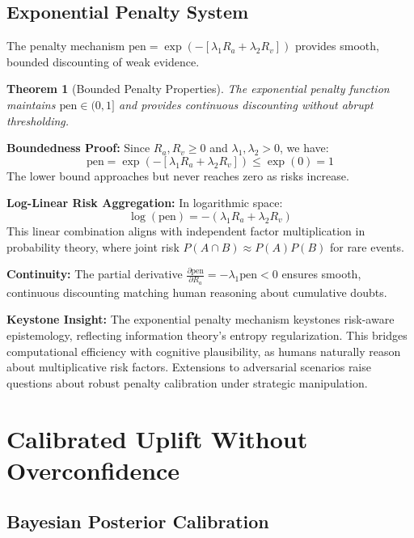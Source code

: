 \documentclass[12pt,a4paper]{article}
\newtheorem{theorem}{Theorem}[section]
\theoremstyle{definition}
\theoremstyle{remark}
\begin{document}
\subsection{Exponential Penalty System}

The penalty mechanism $\text{pen} = \exp(-[\lambda_1 R_a + \lambda_2 R_v])$ provides smooth, bounded discounting of weak evidence.

\begin{theorem}[Bounded Penalty Properties]
The exponential penalty function maintains $\text{pen} \in (0,1]$ and provides continuous discounting without abrupt thresholding.
\end{theorem}

\begin{proofbox}
\textbf{Boundedness Proof:} Since $R_a, R_v \geq 0$ and $\lambda_1, \lambda_2 > 0$, we have:
$$\text{pen} = \exp(-[\lambda_1 R_a + \lambda_2 R_v]) \leq \exp(0) = 1$$
The lower bound approaches but never reaches zero as risks increase.

\textbf{Log-Linear Risk Aggregation:} In logarithmic space:
$$\log(\text{pen}) = -(\lambda_1 R_a + \lambda_2 R_v)$$
This linear combination aligns with independent factor multiplication in probability theory, where joint risk $P(A \cap B) \approx P(A)P(B)$ for rare events.

\textbf{Continuity:} The partial derivative $\frac{\partial \text{pen}}{\partial R_a} = -\lambda_1 \text{pen} < 0$ ensures smooth, continuous discounting matching human reasoning about cumulative doubts.
\end{proofbox}

\begin{reflectionbox}
\textbf{Keystone Insight:} The exponential penalty mechanism keystones risk-aware epistemology, reflecting information theory's entropy regularization. This bridges computational efficiency with cognitive plausibility, as humans naturally reason about multiplicative risk factors. Extensions to adversarial scenarios raise questions about robust penalty calibration under strategic manipulation.
\end{reflectionbox}

\section{Calibrated Uplift Without Overconfidence}

\subsection{Bayesian Posterior Calibration}
\end{document}
